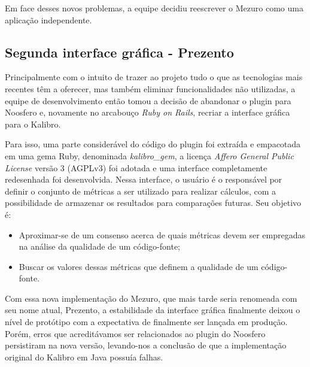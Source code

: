 \documentclass{llncs}
\begin{document}
  Em face desses novos problemas, a equipe decidiu reescrever o Mezuro como uma aplicação independente.

  \subsection{Segunda interface gráfica - Prezento}\label{sec:segundo-prototipo}

  Principalmente com o intuito de trazer ao projeto tudo o que as tecnologias mais recentes têm a oferecer, mas também eliminar funcionalidades não utilizadas, a equipe de desenvolvimento então tomou a decisão de abandonar o plugin para Noosfero e, novamente no arcabouço \textit{Ruby on Rails}, recriar a interface gráfica para o Kalibro.

  Para isso, uma parte considerável do código do plugin foi extraída e empacotada em uma gema Ruby, denominada \textit{kalibro\_gem}, a licença \textit{Affero General Public License} versão 3 (AGPLv3) foi adotada e uma interface completamente redesenhada foi desenvolvida. Nessa interface, o usuário é o responsável por definir o conjunto de métricas a ser utilizado para realizar cálculos, com a possibilidade de armazenar os resultados para comparações futuras. Seu objetivo é:

  \begin{itemize}
    \item Aproximar-se de um consenso acerca de quais métricas devem ser empregadas na análise da qualidade de um código-fonte;
    \item Buscar os valores dessas métricas que definem a qualidade de um código-fonte.
  \end{itemize}

  Com essa nova implementação do Mezuro, que mais tarde seria renomeada com seu nome atual, Prezento, a estabilidade da interface gráfica finalmente deixou o nível de protótipo com a expectativa de finalmente ser lançada em produção. Porém, erros que acreditávamos ser relacionados ao plugin do Noosfero persistiram na nova versão, levando-nos a conclusão de que a implementação original do Kalibro em Java possuía falhas.
\end{document}
